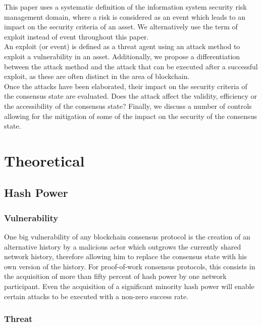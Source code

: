 \documentclass[11pt,a4paper,draft]{article}
\begin{document}
This paper uses a systematic definition of the information system security risk management domain, where a risk is considered as an event which leads to an impact on the security criteria of an asset. We alternatively use the term of exploit instead of event throughout this paper.\\

An exploit (or event) is defined as a threat agent using an attack method to exploit a vulnerability in an asset. Additionally, we propose a differentiation between the attack method and the attack that can be executed after a successful exploit, as these are often distinct in the area of blockchain.\\

Once the attacks have been elaborated, their impact on the security criteria of the consensus state are evaluated. Does the attack affect the validity, efficiency or the accessibility of the consensus state? Finally, we discuss a number of controls allowing for the mitigation of some of the impact on the security of the consensus state.\\

\section{Theoretical}

\subsection{Hash Power}

\subsubsection{Vulnerability}

One big vulnerability of any blockchain consensus protocol is the creation of an alternative history by a malicious actor which outgrows the currently shared network history, therefore allowing him to replace the consensus state with his own version of the history. For proof-of-work consensus protocols, this consists in the acquisition of more than fifty percent of hash power by one network participant. Even the acquisition of a significant minority hash power will enable certain attacks to be executed with a non-zero success rate.\\

\subsubsection{Threat}
\end{document}
